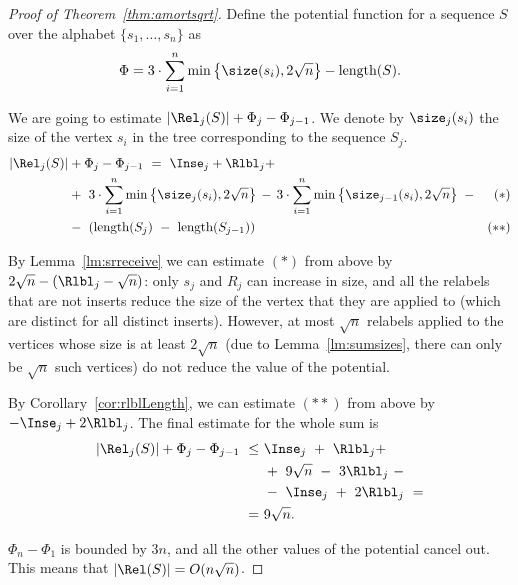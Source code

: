 \begin{proof}[Proof of Theorem~\ref{thm:amortsqrt}] Define the potential function for a \Ds sequence $S$ over the alphabet $\{ s_1, \ldots, s_n \}$ as
   \[
	\Phi = 3 \cdot \sum\limits_{i=1}^n
	\min\left\{ \size(s_i), 2 \sqrt{n} \right\}
	- \text{length} (S).
   \]

We are going to estimate $\rjsz + \Phi_j - \Phi_{j-1}$. We denote by $\size_j (s_i)$ the size of the vertex $s_i$ in the tree corresponding to the sequence $S_j$. \begin{align*}
	\rjsz &+ \Phi_j - \Phi_{j-1}\ =\ 
	\Inse_j + \Rlbl_j + \\
	& +\ 3 \cdot \sum\limits_{i=1}^n
	\min\left\{ \size_j (s_i), 2 \sqrt{n} \right\}\,-\,%
	3 \cdot \sum\limits_{i=1}^n
	\min\left\{ \size_{j-1} (s_i), 2 \sqrt{n} \right\}\ - & (*) \\
	& -\ (\text {length} (S_j)\ -\ \text {length} (S_{j-1})) & (**)
\end{align*}

By Lemma~\ref{lm:srreceive} we can estimate $(*)$ from above by $2 \sqrt{n} - (\Rlbl_j - \sqrt{n})$: only $s_j$ and $R_j$ can increase in size, and all the relabels that are not inserts reduce the size of the vertex that they are applied to (which are distinct for all distinct inserts). However, at most $\sqrt{n}$ relabels applied to the vertices whose size is at least $2 \sqrt {n}$ (due to Lemma~\ref{lm:sumsizes}, there can only be $\sqrt{n}$ such vertices) do not reduce the value of the potential.

By Corollary~\ref{cor:rlblLength}, we can estimate $(**)$ from above by $-\Inse_j + 2\Rlbl_j$. The final estimate for the whole sum is \begin{align*}
	\rjsz + \Phi_j - \Phi_{j-1}\ \le\ & \Inse_j\ +\ \Rlbl_j + \\
	& +\ 9\sqrt{n}\ -\ 3\Rlbl_j\ - \\
	& -\ \Inse_j\ +\ 2\Rlbl_j\ = \\
	=\ & 9\sqrt{n}.
\end{align*}

$\Phi_n - \Phi_1$ is bounded by $3n$, and all the other values of the potential cancel out. This means that $\left| \Rel (S) \right| = O(n \sqrt{n})$. \end{proof}
